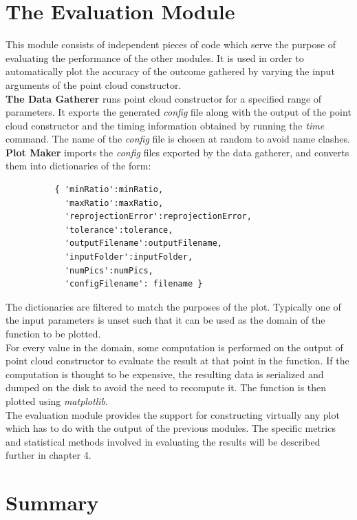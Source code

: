 \documentclass[12pt,a4paper,twoside,openright]{report}
\begin{document}
\section{The Evaluation Module}
This module consists of independent pieces of code which serve the purpose of evaluating the performance of the other modules. It is used in order to automatically plot the accuracy of the outcome gathered by varying the input arguments of the point cloud constructor.\\
\linebreak
\textbf{The Data Gatherer} runs point cloud constructor for a specified range of parameters. It exports the generated \emph{config} file along with the output of the point cloud constructor and the timing information obtained by running the \emph{time} command. The name of the \emph{config} file is chosen at random to avoid name clashes.\\
\linebreak
\textbf{Plot Maker} imports the \emph{config} files exported by the data gatherer, and converts them into dictionaries of the form: \begin{verbatim}    
          { 'minRatio':minRatio,
            'maxRatio':maxRatio,
            'reprojectionError':reprojectionError,
            'tolerance':tolerance,
            'outputFilename':outputFilename,
            'inputFolder':inputFolder,
            'numPics':numPics,
            'configFilename': filename }
\end{verbatim}
The dictionaries are filtered to match the purposes of the plot. Typically one of the input parameters is unset such that it can be used as the domain of the function to be plotted.\\
For every value in the domain, some computation is performed on the output of point cloud constructor to evaluate the result at that point in the function. If the computation is thought to be expensive, the resulting data is serialized and dumped on the disk to avoid the need to recompute it. The function is then plotted using \emph{matplotlib}.\\
\linebreak
The evaluation module provides the support for constructing virtually any plot which has to do with the output of the previous modules. The specific metrics and statistical methods involved in evaluating the results will be described further in chapter 4. 
\section{Summary} 
\end{document}
